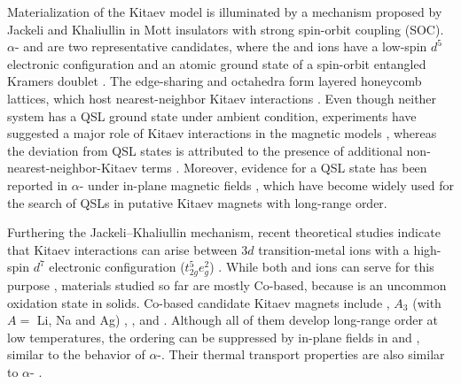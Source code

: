 \documentclass[%
reprint,
superscriptaddress,
amsmath,amssymb,
aps,
prb,
]{revtex4-2}
\begin{document}
Materialization of the Kitaev model is illuminated by a mechanism proposed by Jackeli and Khaliullin \cite{JackeliPRL2009} in Mott insulators with strong spin-orbit coupling (SOC). $\alpha$- and  are two representative candidates, where the  and  ions have a low-spin $d^5$ electronic configuration and an atomic ground state of a spin-orbit entangled Kramers doublet \cite{PlumbPRB2014,ChaloupkaPRL2010,SinghPRB2010}. The edge-sharing  and  octahedra form layered honeycomb lattices, which host nearest-neighbor Kitaev interactions \cite{JackeliPRL2009}. Even though neither system has a QSL ground state under ambient condition, experiments have suggested a major role of Kitaev interactions in the magnetic models \cite{BanerjeeNM2016,BanerjeeScience2017,ChunNP2015,Kim2020,Takagi2019}, whereas the deviation from QSL states is attributed to the presence of additional non-nearest-neighbor-Kitaev terms \cite{ChaloupkaPRL2013,KatukuriNJP2014,RauPRL2014}. Moreover, evidence for a QSL state has been reported in $\alpha$- under in-plane magnetic fields \cite{SearsPRB2017,KasaharaNature2018,BanerjeeNPJQM2018,YokoiScience2021,TanakaNP2022}, which have become widely used for the search of QSLs in putative Kitaev magnets with long-range order.
	
Furthering the Jackeli–Khaliullin mechanism, recent theoretical studies indicate that Kitaev interactions can arise between 3$d$ transition-metal ions with a high-spin $d^7$ electronic configuration ($t_{2g}^{5}e_{g}^{2}$) \cite{LiuPRB2018,SanoPRB2018,LiuPRL2020,MotomeJPCM2020,KimJPCM2021_2}. While both  and  ions can serve for this purpose \cite{MotomeJPCM2020}, materials studied so far are mostly Co-based, because  is an uncommon oxidation state in solids. Co-based candidate Kitaev magnets include  \cite{ViciuJSSC2007,LefrancoisPRB2016,BeraPRB2017,XiaoCGD2019}, $A_3$ (with $A =$ Li, Na and Ag) \cite{StratanNJC2019,ViciuJSSC2007,WongJSSC2016,YanPRB2019,ZverevaDT2016},  \cite{IshikawaJPSJ1958,YuanPRX2020},  \cite{RegnaultPhysicaB1977,ZhongSA2020} and  \cite{NairPRB2018}. Although all of them develop long-range order at low temperatures, the ordering can be suppressed by in-plane fields in  \cite{YaoPRB2020,LinNC2021} and  \cite{ZhongSA2020}, similar to the behavior of $\alpha$-. Their thermal transport properties are also similar to $\alpha$- \cite{HongPRB2021,ZhongSA2020}.
	
\end{document}
